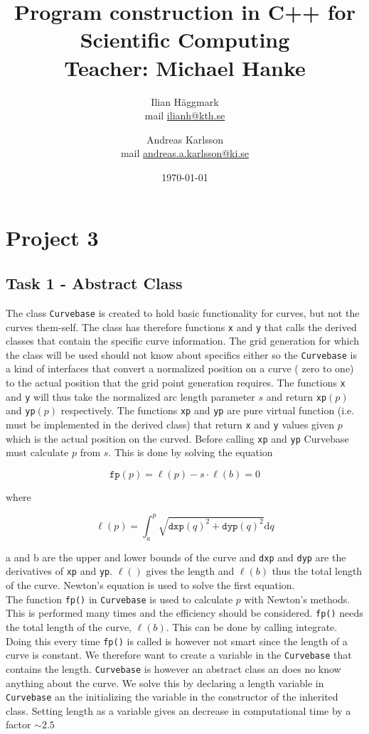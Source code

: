 \documentclass[paper=a4, fontsize=12pt]{article} %
\title{Program construction in C++ for Scientific Computing \\ Teacher: Michael Hanke}
\author{Ilian H{\"a}ggmark \\ mail \href{mailto:ilianh@kth.se}{ilianh@kth.se}
  \and Andreas Karlsson \\ mail \href{mailto:andreas.a.karlsson@ki.se}{andreas.a.karlsson@ki.se} }
\date{\normalsize\today} %
\begin{document}
\maketitle %

\section*{Project 3}
\subsection*{Task 1 - Abstract Class}

The class \texttt{Curvebase} is created to hold basic functionality for curves, but not the curves them-self. The class has therefore functions \texttt{x} and \texttt{y} that calls the derived classes that contain the specific curve information. The grid generation for which the class will be used should not know about specifics either so the \texttt{Curvebase} is a kind of interfaces that convert a normalized position on a curve ( zero to one) to the actual position that the grid point generation requires. The functions \texttt{x} and \texttt{y} will thus take the normalized arc length parameter $s$ and return \texttt{xp}$(p)$ and \texttt{yp}$(p)$ respectively. The functions \texttt{xp} and \texttt{yp} are pure virtual function (i.e. must be implemented in the derived class) that return \texttt{x} and \texttt{y} values given $p$ which is the actual position on the curved. Before calling \texttt{xp} and \texttt{yp} Curvebase must calculate $p$ from $s$. This is done by solving the equation 

$$ \texttt{fp}(p) = \ell(p)- s\cdot  \ell(b) = 0 $$

where 

$$ \ell (p) = \int_a^p \sqrt{\texttt{dxp}(q)^2+\texttt{dyp}(q)^2} \textrm{d}q $$

a and b are the upper and lower bounds of the curve and \texttt{dxp} and \texttt{dyp} are the derivatives of \texttt{xp} and \texttt{yp}. $\ell ()$ gives the length and $\ell (b)$ thus the total length of the curve. Newton's equation is used to solve the first equation.\\

The function \texttt{fp()} in \texttt{Curvebase} is used to calculate $p$ with Newton's methods. This is performed many times and the efficiency should be considered. \texttt{fp()} needs the total length of the curve, $\ell (b)$. This can be done by calling integrate. Doing this every time \texttt{fp()} is called is however not smart since the length of a curve is constant. We therefore want to create a variable in the \texttt{Curvebase} that contains the length. \texttt{Curvebase} is however an abstract class an does no know anything about the curve. We solve this by declaring a length variable in \texttt{Curvebase} an the initializing the variable in the constructor of the inherited class. Setting length as a variable gives an decrease in computational time by a factor $\sim 2.5$\\
\end{document}
